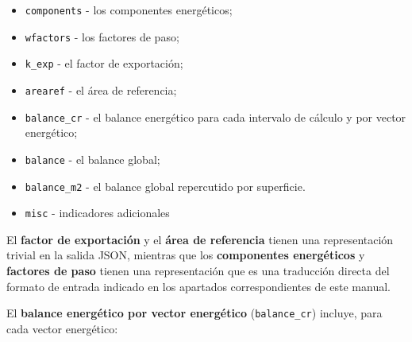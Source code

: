 \documentclass[10pt,notitlepage,oneside,a4paper]{article}
\begin{document}
\begin{itemize}
\item \texttt{components} - los componentes energéticos;
\item \texttt{wfactors} - los factores de paso;
\item \texttt{k\_exp} - el factor de exportación;
\item \texttt{arearef} - el área de referencia;
\item \texttt{balance\_cr} - el balance energético para cada intervalo de cálculo y por vector energético;
\item \texttt{balance} - el balance global;
\item \texttt{balance\_m2} - el balance global repercutido por superficie.
\item \texttt{misc} - indicadores adicionales
\end{itemize}

El \textbf{factor de exportación} y el \textbf{área de referencia} tienen una representación trivial en la salida JSON, mientras que los \textbf{componentes energéticos} y \textbf{factores de paso} tienen una representación que es una traducción directa del formato de entrada indicado en los apartados correspondientes de este manual.

El \textbf{balance energético por vector energético} (\texttt{balance\_cr}) incluye, para cada vector energético:
\end{document}
